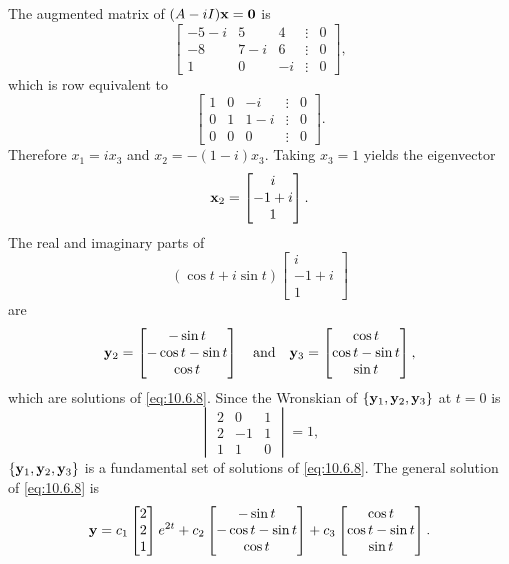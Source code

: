 \documentclass{ximera}
\begin{document}
\begin{example}
\begin{explanation}
The augmented  matrix of $(A-iI){\bf x=0}$ is
$$
\begin{bmatrix}-5-i&5&4&\vdots&0\\-8&
7-i&6&\vdots&0\\ 1&0&-i&\vdots&0
\end{bmatrix},
$$
which is row equivalent to
$$
\begin{bmatrix}1&0&-i&\vdots&0\\ 0&1&1-i&
\vdots&0\\ 0&0&0&\vdots&0\end{bmatrix}.
$$
Therefore $x_1=ix_3$ and $x_2=-(1-i)x_3$. Taking $x_3=1$ yields
the eigenvector
$$
{\bf x}_2=\begin{bmatrix} i\\-1+i\\ 1\end{bmatrix}.
$$
The real and imaginary parts of
$$
(\cos t+i\sin t)\begin{bmatrix}i\\-1+i\\1\end{bmatrix}
$$
 are
$$
{\bf y}_2=
\begin{bmatrix}-\sin t\\-\cos t-\sin t\\\cos t\end{bmatrix}
\quad\mbox{and}\quad
{\bf y}_3=\begin{bmatrix}\cos t\\\cos t-\sin t\\\sin
t\end{bmatrix},
 $$
which are solutions of  \eqref{eq:10.6.8}.
Since the  Wronskian of $\{{\bf y}_1,{\bf y}_2,{\bf y}_3\}$
at $t=0$  is
$$
\begin{vmatrix}
2&0&1\\2&-1&1\\1&1&0\end{vmatrix}=1,
$$
 $\{{\bf y}_1,{\bf y}_2,{\bf y}_3\}$ is a
fundamental set of solutions of \eqref{eq:10.6.8}. The general solution of
\eqref{eq:10.6.8} is
$$
{\bf y}=c_1 \begin{bmatrix}2\\2\\1\end{bmatrix}e^{2t}
+c_2\begin{bmatrix}-\sin t\\-\cos t-\sin t\\\cos t\end{bmatrix}
+c_3\begin{bmatrix}\cos t\\\cos t-\sin t\\\sin
t\end{bmatrix}.
$$
\end{explanation}
\end{example}
\end{document}
